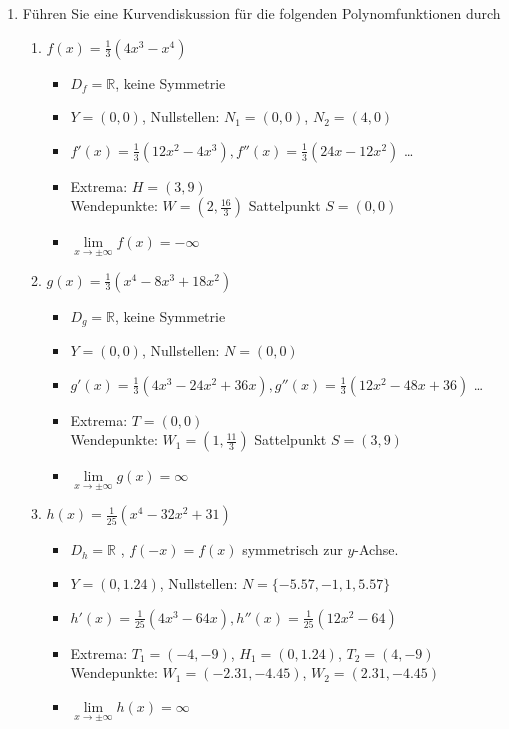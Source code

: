 \begin{enumerate}
    \item 
    Führen Sie eine Kurvendiskussion für die folgenden Polynomfunktionen durch
    \begin{enumerate}
        \item $f(x) = \frac{1}{3}(4x^3 - x^4)$
        \begin{itemize}
            \item $D_f = \mathbb{R}$, keine Symmetrie
            \item $Y = (0, 0)$, Nullstellen: $N_1 = (0, 0)$, $N_2 = (4, 0)$
            \item $f'(x) =\frac{1}{3}(12x^2 - 4x^3) , f''(x)=\frac{1}{3}(24x - 12x^2)$ \dots
            \item Extrema: $H = (3, 9)$ \\
                  Wendepunkte: $W = (2, \frac{16}{3})$
                  Sattelpunkt $S = (0, 0)$
            \item $\lim\limits_{x \to \pm\infty} f(x) = -\infty$
        \end{itemize}

        \item $g(x) = \frac{1}{3}(x^4 - 8x^3 + 18x^2)$
        \begin{itemize}
            \item $D_g = \mathbb{R}$, keine Symmetrie
            \item $Y = (0, 0)$, Nullstellen: $N = (0,0)$
            \item $g'(x)= \frac{1}{3}(4x^3 - 24x^2 + 36x), g''(x)= \frac{1}{3}(12x^2 - 48x + 36)$ \dots
            \item Extrema: $T=(0, 0)$ \\
                  Wendepunkte: $W_1 = (1, \frac{11}{3})$
                  Sattelpunkt $S = (3, 9)$
            \item $\lim\limits_{x \to \pm\infty} g(x) = \infty$
        \end{itemize}

        \item $h(x) = \frac{1}{25}(x^4 - 32x^2 + 31)$
        \begin{itemize}
            \item $D_h = \mathbb{R}$ , $f(-x) = f(x)$ symmetrisch zur $y$-Achse.
            \item $Y = (0, 1.24)$, Nullstellen: $N = \{-5.57, -1, 1, 5.57\}$
            \item $h'(x) = \frac{1}{25}(4x^3 - 64x), h''(x)= \frac{1}{25}(12x^2 - 64)$ 
            \item Extrema: $T_1 = (-4, -9)$, $H_1 = (0, 1.24)$, $T_2 = (4, -9)$ \\
                  Wendepunkte: $W_1 = (-2.31, -4.45)$, $W_2 = (2.31, -4.45)$
            \item $\lim\limits_{x \to \pm\infty} h(x) = \infty$
        \end{itemize}
    \end{enumerate}



\end{enumerate}
